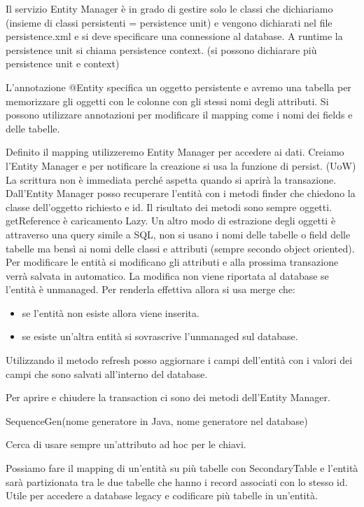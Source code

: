 Il servizio Entity Manager è in grado di gestire solo le classi che dichiariamo
(insieme di classi persistenti = persistence unit) e vengono dichiarati nel file
persistence.xml e si deve specificare una connessione al database. A runtime la
persistence unit si chiama persistence context. (si possono dichiarare più
persistence unit e context)

L'annotazione @Entity specifica un oggetto persistente e avremo una tabella
per memorizzare gli oggetti con le colonne con gli stessi nomi degli attributi.
Si possono utilizzare annotazioni per modificare il mapping come i nomi dei
fields e delle tabelle.

Definito il mapping utilizzeremo Entity Manager per accedere ai dati. Creiamo
l'Entity Manager e per notificare la creazione si usa la funzione di persist.
(UoW) La scrittura non è immediata perché aspetta quando si aprirà la transazione.
Dall'Entity Manager posso recuperare l'entità con i metodi finder che chiedono la
classe dell'oggetto richiesto e id. Il risultato dei metodi sono sempre oggetti.
getReference è caricamento Lazy.
Un altro modo di estrazione degli oggetti è attraverso una query simile a SQL,
non si usano i nomi delle tabelle o field delle tabelle ma bensì ai nomi delle
classi e attributi (sempre secondo object oriented).
Per modificare le entità si modificano gli attributi e alla prossima transazione
verrà salvata in automatico. La modifica non viene riportata al database se
l'entità è unmanaged. Per renderla effettiva allora si usa merge che:
\begin{itemize}
      \item se l'entità non esiste allora viene inserita.
      \item se esiste un'altra entità si sovrascrive l'unmanaged sul database.
\end{itemize}
Utilizzando il metodo refresh posso aggiornare i campi dell'entità con i valori
dei campi che sono salvati all'interno del database.

Per aprire e chiudere la transaction ci sono dei metodi dell'Entity Manager.

SequenceGen(nome generatore in Java, nome generatore nel database)

Cerca di usare sempre un'attributo ad hoc per le chiavi.

Possiamo fare il mapping di un'entità su più tabelle con SecondaryTable e l'entità
sarà partizionata tra le due tabelle che hanno i record associati con lo stesso
id. Utile per accedere a database legacy e codificare più tabelle in un'entità.


